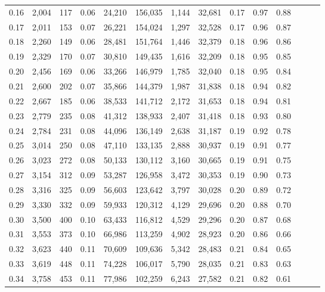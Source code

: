 \begin{tabular}{rrrrrrrrrrrrrr}
0.16 &  2,004 &  117 &  0.06 &   24,210 &  156,035 &   1,144 &  32,681 &  0.17 &  0.97 &      0.88 \\
0.17 &  2,011 &  153 &  0.07 &   26,221 &  154,024 &   1,297 &  32,528 &  0.17 &  0.96 &      0.87 \\
0.18 &  2,260 &  149 &  0.06 &   28,481 &  151,764 &   1,446 &  32,379 &  0.18 &  0.96 &      0.86 \\
0.19 &  2,329 &  170 &  0.07 &   30,810 &  149,435 &   1,616 &  32,209 &  0.18 &  0.95 &      0.85 \\
0.20 &  2,456 &  169 &  0.06 &   33,266 &  146,979 &   1,785 &  32,040 &  0.18 &  0.95 &      0.84 \\
0.21 &  2,600 &  202 &  0.07 &   35,866 &  144,379 &   1,987 &  31,838 &  0.18 &  0.94 &      0.82 \\
0.22 &  2,667 &  185 &  0.06 &   38,533 &  141,712 &   2,172 &  31,653 &  0.18 &  0.94 &      0.81 \\
0.23 &  2,779 &  235 &  0.08 &   41,312 &  138,933 &   2,407 &  31,418 &  0.18 &  0.93 &      0.80 \\
0.24 &  2,784 &  231 &  0.08 &   44,096 &  136,149 &   2,638 &  31,187 &  0.19 &  0.92 &      0.78 \\
0.25 &  3,014 &  250 &  0.08 &   47,110 &  133,135 &   2,888 &  30,937 &  0.19 &  0.91 &      0.77 \\
0.26 &  3,023 &  272 &  0.08 &   50,133 &  130,112 &   3,160 &  30,665 &  0.19 &  0.91 &      0.75 \\
0.27 &  3,154 &  312 &  0.09 &   53,287 &  126,958 &   3,472 &  30,353 &  0.19 &  0.90 &      0.73 \\
0.28 &  3,316 &  325 &  0.09 &   56,603 &  123,642 &   3,797 &  30,028 &  0.20 &  0.89 &      0.72 \\
0.29 &  3,330 &  332 &  0.09 &   59,933 &  120,312 &   4,129 &  29,696 &  0.20 &  0.88 &      0.70 \\
0.30 &  3,500 &  400 &  0.10 &   63,433 &  116,812 &   4,529 &  29,296 &  0.20 &  0.87 &      0.68 \\
0.31 &  3,553 &  373 &  0.10 &   66,986 &  113,259 &   4,902 &  28,923 &  0.20 &  0.86 &      0.66 \\
0.32 &  3,623 &  440 &  0.11 &   70,609 &  109,636 &   5,342 &  28,483 &  0.21 &  0.84 &      0.65 \\
0.33 &  3,619 &  448 &  0.11 &   74,228 &  106,017 &   5,790 &  28,035 &  0.21 &  0.83 &      0.63 \\
0.34 &  3,758 &  453 &  0.11 &   77,986 &  102,259 &   6,243 &  27,582 &  0.21 &  0.82 &      0.61 \\

\end{tabular}

